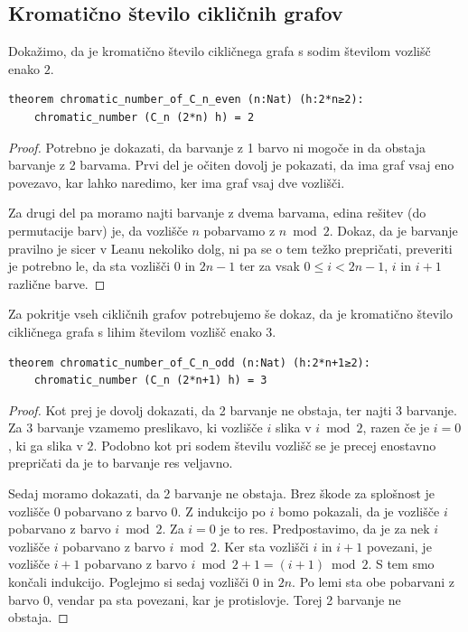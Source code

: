 \documentclass[mat1]{fmfdelo}
\begin{document}
\subsection{Kromatično število cikličnih grafov}
Dokažimo, da je kromatično število cikličnega grafa s sodim številom vozlišč enako $2$.
\begin{lstlisting}
theorem chromatic_number_of_C_n_even (n:Nat) (h:2*n≥2):
    chromatic_number (C_n (2*n) h) = 2
\end{lstlisting}
\begin{proof}
Potrebno je dokazati, da barvanje z 1 barvo ni mogoče in da obstaja barvanje z 2 barvama.
Prvi del je očiten dovolj je pokazati, da ima graf vsaj eno povezavo, kar lahko naredimo, ker ima graf vsaj dve vozlišči.

Za drugi del pa moramo najti barvanje z dvema barvama, edina rešitev (do permutacije barv) je, da vozlišče
$n$ pobarvamo z $n\bmod 2$. Dokaz, da je barvanje pravilno je sicer v Leanu nekoliko dolg, ni pa se o tem
težko prepričati, preveriti je potrebno le, da sta vozlišči $0$ in $2n-1$ ter za vsak $0\le i<2n-1$, $i$ in $i+1$ različne barve.
\end{proof}

Za pokritje vseh cikličnih grafov potrebujemo še dokaz, da je kromatično število cikličnega grafa s lihim številom vozlišč enako $3$.
\begin{lstlisting}
theorem chromatic_number_of_C_n_odd (n:Nat) (h:2*n+1≥2):
    chromatic_number (C_n (2*n+1) h) = 3
\end{lstlisting}
\begin{proof}
Kot prej je dovolj dokazati, da 2 barvanje ne obstaja, ter najti 3 barvanje. 
Za 3 barvanje vzamemo preslikavo, ki vozlišče $i$ slika v $i\bmod 2$, razen če je $i=0$, ki ga slika v $2$.
Podobno kot pri sodem številu vozlišč se je precej enostavno prepričati da je to barvanje res veljavno. 

Sedaj moramo dokazati, da 2 barvanje ne obstaja. Brez škode za splošnost je vozlišče $0$ pobarvano z barvo $0$.
Z indukcijo po $i$ bomo pokazali, da je vozlišče $i$ pobarvano z barvo $i\bmod 2$.
Za $i=0$ je to res. Predpostavimo, da je za nek $i$ vozlišče $i$ pobarvano z barvo $i\bmod 2$.
Ker sta vozlišči $i$ in $i+1$ povezani, je vozlišče $i+1$ pobarvano z barvo $i\bmod 2 + 1 = (i+1)\bmod 2$.
S tem smo končali indukcijo.
Poglejmo si sedaj vozlišči $0$ in $2n$. Po lemi sta obe pobarvani z barvo $0$, vendar pa sta povezani, kar je protislovje.
Torej 2 barvanje ne obstaja. 
\end{proof}
\end{document}
